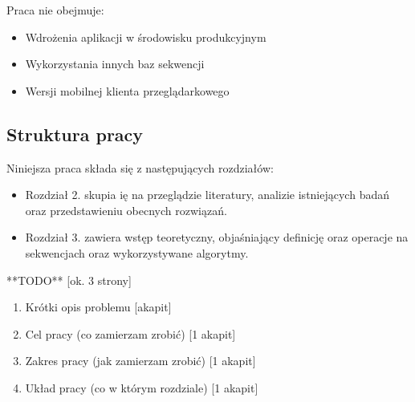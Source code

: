         Praca nie obejmuje:
        \begin{itemize}
            \item Wdrożenia aplikacji w środowisku produkcyjnym
            \item Wykorzystania innych baz sekwencji
            \item Wersji mobilnej klienta przeglądarkowego
        \end{itemize}

    \subsection {
        Struktura pracy
    }

        Niniejsza praca składa się z następujących rozdziałów:

        \begin{itemize}
            \item {
                Rozdział 2. skupia ię na przeglądzie literatury, analizie istniejących
                badań oraz przedstawieniu obecnych rozwiązań.
            }
            \item {
                Rozdział 3. zawiera wstęp teoretyczny, objaśniający definicję oraz 
                operacje na sekwencjach oraz wykorzystywane algorytmy.
            }
        \end{itemize}















**TODO** [ok. 3 strony]

\begin{enumerate}
    \item Krótki opis problemu [akapit]
    \item Cel pracy (co zamierzam zrobić) [1 akapit]
    \item Zakres pracy (jak zamierzam zrobić) [1 akapit]
    \item Układ pracy (co w którym rozdziale) [1 akapit]
\end{enumerate}



